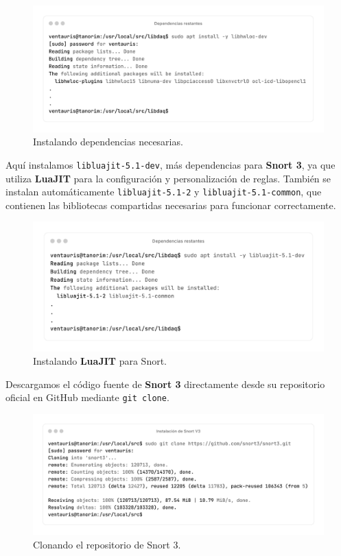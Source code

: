 \documentclass[12pt,a4paper]{report}
\begin{document}
\begin{figure}[H]
	\centering
	\includegraphics[scale=0.12]{instalacion_snort/15-15.png}
	\caption{Instalando dependencias necesarias.}
\end{figure}

Aquí instalamos \texttt{libluajit-5.1-dev}, más dependencias para \textbf{Snort 3}, ya que utiliza \textbf{LuaJIT} para la configuración y personalización de reglas. También se instalan automáticamente \texttt{libluajit-5.1-2} y \texttt{libluajit-5.1-common}, que contienen las bibliotecas compartidas necesarias para funcionar correctamente.

\begin{figure}[H]
	\centering
	\includegraphics[scale=0.12]{instalacion_snort/16-16.png}
	\caption{Instalando \textbf{LuaJIT} para Snort.}
\end{figure}

\newpage

Descargamos el código fuente de \textbf{Snort 3} directamente desde su repositorio oficial en GitHub mediante \texttt{git clone}.

\begin{figure}[H]
	\centering
	\includegraphics[scale=0.12]{instalacion_snort/17-17.png}
	\caption{Clonando el repositorio de Snort 3.}
\end{figure}
\end{document}
